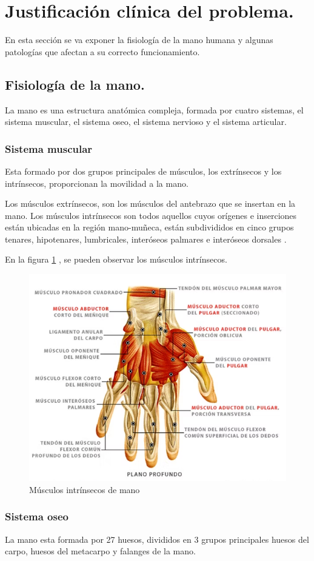 \section{Justificación clínica del problema.}

En esta sección se va exponer la fisiología de la mano humana y algunas patologías que afectan a su correcto funcionamiento.
\subsection{Fisiología de la mano.}

La mano es una estructura anatómica compleja, formada por cuatro sistemas, el sistema muscular, el sistema oseo, el sistema nervioso y el sistema articular. 

\subsubsection{Sistema muscular}

Esta formado por dos grupos principales de músculos, los extrínsecos y los intrínsecos, proporcionan la movilidad a la mano. 

Los músculos extrínsecos, son los músculos del antebrazo que se insertan en la mano. Los músculos intrínsecos son todos aquellos cuyos orígenes e inserciones están ubicadas en la región mano-muñeca, están subdivididos en cinco grupos tenares, hipotenares, lumbricales, interóseos palmares e interóseos dorsales . 

En la figura \ref{fig:Músculos_mano} , se pueden observar los músculos intrínsecos.
\begin{figure}
    \centering
    \includegraphics[width=0.5\linewidth]{img/Musculos_mano.png}
    \caption{Músculos intrínsecos de mano}
    \label{fig:Músculos_mano}
\end{figure}


\subsubsection{Sistema oseo}
La mano esta formada por 27 huesos, divididos en 3 grupos principales huesos del carpo, huesos del metacarpo y falanges de la mano.

